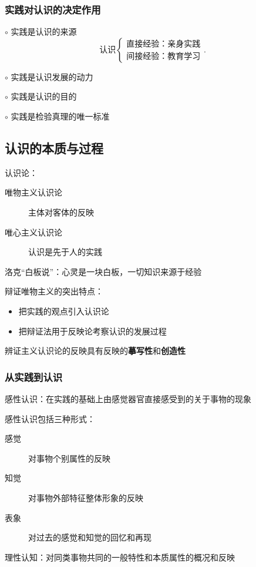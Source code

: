 \subsubsection{实践对认识的决定作用}%
\label{subsub:实践对认识的决定作用}
$\circ$ 实践是认识的来源
\[
    \text{认识}
    \begin{cases}
        \text{直接经验：亲身实践}\\
        \text{间接经验：教育学习}
    \end{cases}
.\] 

$\circ$ 实践是认识发展的动力

$\circ$ 实践是认识的目的

$\circ$ 实践是检验真理的唯一标准
\subsection{认识的本质与过程}%
\label{sub:认识的本质与过程}
\begin{defi}
    认识论：
    \begin{description}
        \item[唯物主义认识论] 主体对客体的反映
        \item[唯心主义认识论] 认识是先于人的实践
    \end{description}
\end{defi}
\begin{notation}
    洛克“白板说”：心灵是一块白板，一切知识来源于经验
\end{notation}
辩证唯物主义的突出特点：
\begin{itemize}
    \item 把实践的观点引入认识论
    \item 把辩证法用于反映论考察认识的发展过程
\end{itemize}
辨证主义认识论的反映具有反映的\textbf{摹写性}和\textbf{创造性} 
\subsubsection*{从实践到认识}%
\label{subsub:从实践到认识}
\begin{defi}
    感性认识：在实践的基础上由感觉器官直接感受到的关于事物的现象
\end{defi}
感性认识包括三种形式：
\begin{description}
    \item[感觉] 对事物个别属性的反映
    \item[知觉] 对事物外部特征整体形象的反映
    \item[表象] 对过去的感觉和知觉的回忆和再现
\end{description}
\begin{defi}
    理性认知：对同类事物共同的一般特性和本质属性的概况和反映
\end{defi}

